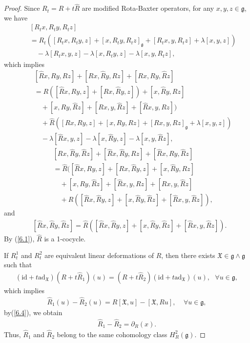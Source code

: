 \documentclass[12pt]{amsart}
\theoremstyle{definition}
\begin{document}
\begin{proof}
Since $R_t = R+t\hat{R}$ are modified Rota-Baxter operators,  for any  $x, y, z \in \mathfrak{g}$, we have
\begin{align*}
& [R_tx, R_ty, R_tz]\\
 &=R_t( [R_tx, R_ty, z]+[x, R_ty, R_tz]_\mathfrak{g}+[R_tx, y, R_tz]+\lambda [x, y, z])\\
\quad &\quad-\lambda [R_tx, y, z]-\lambda[x, R_ty, z]-\lambda[x, y, R_tz],
\end{align*}
which implies
\begin{align}
& [ \hat{R}x, Ry, Rz]+[Rx,  \hat{R}y, Rz]+[Rx, Ry,  \hat{R}z]\label{6.1}\\
&=R( [\hat{R}x, Ry, z]+[Rx, \hat{R}y, z])+[x, \hat{R}y, Rz]\nonumber\\
\quad&\quad+[x, Ry, \hat{R}z]+[Rx, y, \hat{R}z]+[\hat{R}x, y, Rz])\nonumber\\
\quad&\quad+\hat{R}( [Rx, Ry, z]+[x, Ry, Rz]+[Rx, y, Rz]_\mathfrak{g}+\lambda[x, y, z])\nonumber\\
\quad &\quad- \lambda[\hat{R}x, y, z]-\lambda[x, \hat{R}y, z]-\lambda[x, y, \hat{R}z],\nonumber
\end{align}
\begin{align}
& [ Rx, \hat{R}y, \hat{R}z]+[\hat{R}x,  \hat{R}y, Rz]+[ \hat{R}x, Ry,  \hat{R}z]\\
\quad&=\hat{R}([\hat{R}x, Ry, z]+[Rx, \hat{R}y, z]+[x, \hat{R}y, Rz]\nonumber\\
\quad&\quad +[x, Ry, \hat{R}z]+[\hat{R}x, y, Rz]+[Rx, y, \hat{R}z]\nonumber\\
\quad&\quad+R( [\hat{R}x, \hat{R}y, z]+[x, \hat{R}y, \hat{R}z]+[\hat{R}x, y, \hat{R}z]),\nonumber
\end{align}
and
\begin{align}
& [\hat{R}x, \hat{R}y, \hat{R}z]=\hat{R}( [\hat{R}x, \hat{R}y, z]+[x, \hat{R}y, \hat{R}z]+[\hat{R}x, y, \hat{R}z]).\label{6.3}
\end{align}
By (\ref{6.1}),  $\hat{R}$ is a 1-cocycle.

 If $R^1_t$ and $R^2_t$ are equivalent linear deformations of $R$, then there exists $\mathfrak{X}\in \mathfrak{g}\wedge \mathfrak{g}$ such that
 \begin{align*}
(\mathrm{id}+t\mathrm{ad}_{\mathfrak{X}})(R+t\hat{R}_1)(u)=(R+t\hat{R}_2)(\mathrm{id}+t\mathrm{ad}_{\mathfrak{X}}) (u), \ \ \ \forall u\in \mathfrak{g},
\end{align*}
which implies
\begin{align}
\hat{R}_1(u)-\hat{R}_2(u)= R[\mathfrak{X}, u]-[\mathfrak{X}, Ru], \ \ \ \ \ \forall u\in \mathfrak{g},\label{6.4}
\end{align}
by(\ref{6.4}), we obtain
\begin{align*}
\hat{R}_1-\hat{R}_2=\partial_R(x).
\end{align*}
Thus, $\hat{R}_1$ and $\hat{R}_2$ belong to the same cohomology class $H^2_R (\mathfrak{g})$.
\end{proof}
\end{document}
